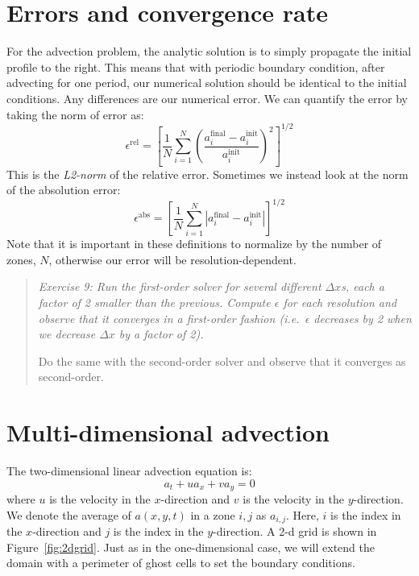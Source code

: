 \documentclass[11pt]{article}
\begin{document}
\section{Errors and convergence rate}

For the advection problem, the analytic solution is to simply propagate
the initial profile to the right.  This means that with periodic boundary
condition, after advecting for one period, our numerical solution should
be identical to the initial conditions.  Any differences are our
numerical error.  We can quantify the error by taking the norm of error as:
\begin{equation}
\epsilon^\mathrm{rel} = \left [ \frac{1}{N} \sum_{i=1}^N 
  \left ( \frac{a_i^\mathrm{final} - a_i^\mathrm{init}}{a_i^\mathrm{init}} 
  \right )^2
  \right ]^{1/2}
\end{equation}
This is the {\em L2-norm} of the relative error.  Sometimes we instead look
at the norm of the absolution error:
\begin{equation}
\epsilon^\mathrm{abs} = \left [ \frac{1}{N} \sum_{i=1}^N 
   | a_i^\mathrm{final} - a_i^\mathrm{init} |
  \right ]^{1/2}
\end{equation}
Note that it is important in these definitions to normalize by the number
of zones, $N$, otherwise our error will be resolution-dependent.
%
\begin{quote}
{\em Exercise 9: Run the first-order solver for several different $\Delta x$s,
each a factor of 2 smaller than the previous.  Compute $\epsilon$ for
each resolution and observe that it converges in a first-order fashion
(i.e.\ $\epsilon$ decreases by 2 when we decrease $\Delta x$ by a factor of 2).

Do the same with the second-order solver and observe that it converges
as second-order.
}
\end{quote}

\section{Multi-dimensional advection}

The two-dimensional linear advection equation is:
\begin{equation}
a_t + u a_x + v a_y = 0
\label{eq:advect2d}
\end{equation}
where $u$ is the velocity in the $x$-direction and $v$ is the velocity in
the $y$-direction.  We denote the average of $a(x,y,t)$ in a zone $i,j$ as
$a_{i,j}$.  Here, $i$ is the index in the $x$-direction and $j$ is the
index in the $y$-direction.  A 2-d grid is shown in Figure~\ref{fig:2dgrid}.
Just as in the one-dimensional case, we will extend the domain with a
perimeter of ghost cells to set the boundary conditions.
\end{document}
